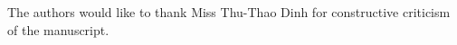 





\appendix

\begin{acks}
  The authors would like to thank Miss Thu-Thao Dinh for constructive criticism of the manuscript.
\end{acks}
